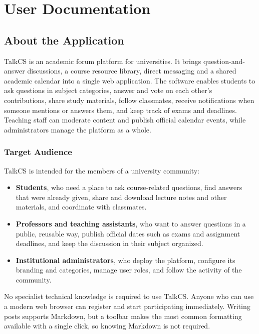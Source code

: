 \chapter{User Documentation}
\label{ch:userdoc}

\section{About the Application}

TalkCS is an academic forum platform for universities. It brings question-and-answer
discussions, a course resource library, direct messaging and a shared academic
calendar into a single web application. The software enables students to ask
questions in subject categories, answer and vote on each other's contributions, share
study materials, follow classmates, receive notifications when someone mentions or
answers them, and keep track of exams and deadlines. Teaching staff can moderate
content and publish official calendar events, while administrators manage the
platform as a whole.

\subsection{Target Audience}

TalkCS is intended for the members of a university community:

\begin{itemize}
  \item \textbf{Students}, who need a place to ask course-related questions, find
    answers that were already given, share and download lecture notes and other
    materials, and coordinate with classmates.
  \item \textbf{Professors and teaching assistants}, who want to answer questions in a
    public, reusable way, publish official dates such as exams and assignment
    deadlines, and keep the discussion in their subject organized.
  \item \textbf{Institutional administrators}, who deploy the platform, configure its
    branding and categories, manage user roles, and follow the activity of the
    community.
\end{itemize}

No specialist technical knowledge is required to use TalkCS. Anyone who can use a
modern web browser can register and start participating immediately. Writing posts
supports Markdown, but a toolbar makes the most common formatting available with a
single click, so knowing Markdown is not required.

